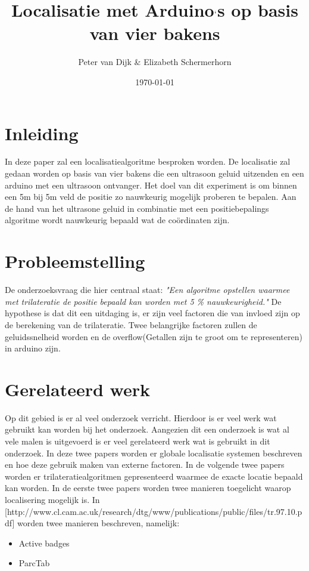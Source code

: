 \documentclass{article}
\author{Peter van Dijk \& Elizabeth Schermerhorn}
\date{\today}
\title{Localisatie met Arduino$`$s op basis van vier bakens}
\begin{document}
\maketitle
\newpage
\tableofcontents
\clearpage
\section{Inleiding}
In deze paper zal een localisatiealgoritme besproken worden. De localisatie zal gedaan worden op basis van vier bakens die een ultrasoon geluid uitzenden en een arduino met een ultrasoon ontvanger. Het doel van dit experiment is om binnen een 5m bij 5m veld de positie zo nauwkeurig mogelijk proberen te bepalen. Aan de hand van het ultrasone geluid in combinatie met een positiebepalings algoritme wordt nauwkeurig bepaald wat de co\"{o}rdinaten zijn. 


\section{Probleemstelling}
De onderzoeksvraag die hier centraal staat: \textit{"Een algoritme opstellen waarmee met trilateratie de positie bepaald kan worden met 5 \% nauwkeurigheid."}
De hypothese is dat dit een uitdaging is, er zijn veel factoren die van invloed zijn op de berekening van de trilateratie. Twee belangrijke factoren zullen de geluidssnelheid worden en de overflow(Getallen zijn te groot om te representeren) in arduino zijn. 


\section{Gerelateerd werk}
Op dit gebied is er al veel onderzoek verricht. Hierdoor is er veel werk wat gebruikt kan worden bij het onderzoek. Aangezien dit een onderzoek is wat al vele malen is uitgevoerd is er veel gerelateerd werk wat is gebruikt in dit onderzoek. In deze twee papers worden er globale localisatie systemen beschreven en hoe deze gebruik maken van externe factoren. In de volgende twee papers worden er trilateratiealgoritmen gepresenteerd waarmee de exacte locatie bepaald kan worden. In de eerste twee papers worden twee manieren toegelicht waarop localisering mogelijk is. In [http://www.cl.cam.ac.uk/research/dtg/www/publications/public/files/tr.97.10.pdf] worden twee manieren beschreven, namelijk:
\begin{itemize}
	\item Active badges
	\item ParcTab
\end{itemize}
\end{document}
